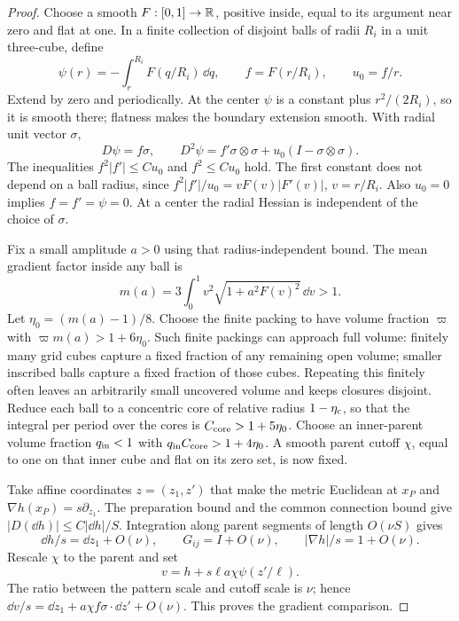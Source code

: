 \begin{proof}
Choose a smooth \(F:[0,1]\to\mathbb R\), positive inside, equal to its
argument near zero and flat at one. In a finite collection of
disjoint balls of radii \(R_i\) in a unit three-cube, define
\[
 \psi(r)=-\int_r^{R_i}F(q/R_i)\,\dd q,\qquad
 f=F(r/R_i),\qquad u_0=f/r.
\]
Extend by zero and periodically. At the center \(\psi\) is a constant
plus \(r^2/(2R_i)\), so it is smooth there; flatness makes the boundary
extension smooth. With radial unit vector \(\sigma\),
\begin{equation}\label{eq:radial}
 D\psi=f\sigma,\qquad
 D^2\psi=f'\sigma\otimes\sigma+u_0(I-\sigma\otimes\sigma).
\end{equation}
The inequalities \(f^2|f'|\le C u_0\) and \(f^2\le C u_0\) hold.
The first constant does not depend on a ball radius, since
\(f^2|f'|/u_0=vF(v)|F'(v)|\), \(v=r/R_i\).
Also \(u_0=0\) implies \(f=f'=\psi=0\).
At a center the radial Hessian is independent of the choice of \(\sigma\).

Fix a small amplitude \(a>0\) using that radius-independent bound.
The mean gradient factor inside any ball is
\[
 m(a)=3\int_0^1v^2\sqrt{1+a^2F(v)^2}\,\dd v>1.
\]
Let \(\eta_0=(m(a)-1)/8\). Choose the finite packing to have volume
fraction \(\varpi\) with \(\varpi m(a)>1+6\eta_0\). Such finite
packings can approach full volume: finitely many grid cubes capture
a fixed fraction of any remaining open volume; smaller inscribed
balls capture a fixed fraction of those cubes. Repeating this
finitely often leaves an arbitrarily small uncovered volume and
keeps closures disjoint. Reduce each ball to a concentric core
of relative radius \(1-\eta_{\rm c}\), so that the integral per
period over the cores is \(C_{\rm core}>1+5\eta_0\).
Choose an inner-parent volume fraction \(q_{\rm in}<1\) with
\(q_{\rm in}C_{\rm core}>1+4\eta_0\).
A smooth parent cutoff \(\chi\), equal to one on that inner cube
and flat on its zero set, is now fixed.

Take affine coordinates \(z=(z_1,z')\) that make the metric
Euclidean at \(x_P\) and \(\nabla h(x_P)=s\partial_{z_1}\).
The preparation bound and the common connection bound give
\(|D(\dd h)|\le C|\dd h|/S\). Integration along parent segments
of length \(O(\nu S)\) gives
\begin{equation}\label{eq:parent}
 \dd h/s=\dd z_1+O(\nu),\qquad G_{ij}=I+O(\nu),
 \qquad |\nabla h|/s=1+O(\nu).
\end{equation}
Rescale \(\chi\) to the parent and set
\begin{equation}\label{eq:modify}
 v=h+s\ell a\chi\psi(z'/\ell).
\end{equation}
The ratio between the pattern scale and cutoff scale is \(\nu\);
hence
\(\dd v/s=\dd z_1+a\chi f\sigma\cdot\dd z'+O(\nu)\).
This proves the gradient comparison.


\end{proof}

